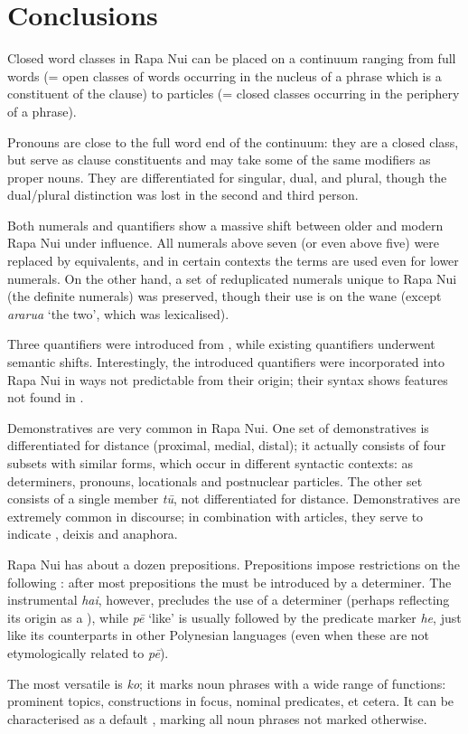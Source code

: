 \section{Conclusions}\label{sec:4.8}

Closed word classes in Rapa Nui can be placed on a continuum ranging from full words (= open classes of words occurring in the nucleus of a phrase which is a constituent of the clause) to particles (= closed classes occurring in the periphery of a phrase). 

Pronouns are close to the full word end of the continuum: they are a closed class, but serve as clause constituents and may take some of the same  modifiers as proper nouns. They are differentiated for singular, dual, and plural, though the dual/plural distinction was lost in the second and third person.

Both numerals and quantifiers show a massive shift between older and modern Rapa Nui under  influence. All numerals above seven (or even above five) were replaced by  equivalents, and in certain contexts the  terms are used even for lower numerals. On the other hand, a set of reduplicated numerals unique to Rapa Nui (the definite numerals) was preserved, though their use is on the wane (except \textit{ararua} ‘the two’, which was lexicalised).

Three quantifiers were introduced from , while existing quantifiers underwent semantic shifts. Interestingly, the introduced quantifiers were incorporated into Rapa Nui in ways not predictable from their  origin; their syntax shows features not found in .

Demonstratives are very common in Rapa Nui. One set of demonstratives is differentiated for distance (proximal, medial, distal); it actually consists of four subsets with similar forms, which occur in different syntactic contexts: as determiners, pronouns, locationals and postnuclear particles. The other set consists of a single member \textit{tū}, not differentiated for distance. Demonstratives are extremely common in discourse; in combination with articles, they serve to indicate , deixis and anaphora.

Rapa Nui has about a dozen prepositions. Prepositions impose restrictions on the following : after most prepositions the  must be introduced by a determiner. The instrumental  \textit{hai}, however, precludes the use of a determiner (perhaps reflecting its origin as a ), while \textit{pē} ‘like’ is usually followed by the predicate marker \textit{he}, just like its counterparts in other Polynesian languages (even when these are not etymologically related to \textit{pē}).

The most versatile  is \textit{ko}; it marks noun phrases with a wide range of functions: prominent topics, constructions in focus, nominal predicates, et cetera. It can be characterised as a default , marking all noun phrases not marked otherwise.
